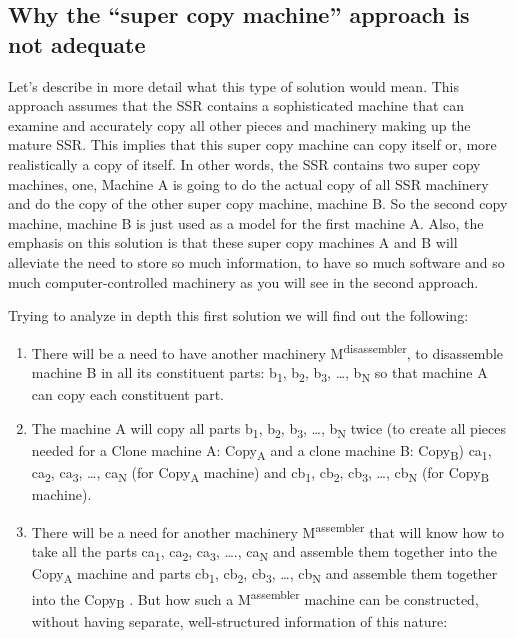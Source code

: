 \subsection[Why the “super copy machine” approach is not adequate]{Why
the “super copy machine” approach is not adequate}

\hypertarget{RefHeading3120306210128}{}Let’s describe in more detail
what this type of solution would mean. This approach assumes that the
SSR contains a sophisticated machine that can examine and accurately
copy all other pieces and machinery making up the mature SSR. This
implies that this super copy machine can copy itself or, more
realistically a copy of itself. In other words, the SSR contains two
super copy machines, one, Machine A is going to do the actual copy of
all SSR machinery and do the copy of the other super copy machine,
machine B. So the second copy machine, machine B is just used as a
model for the first machine A. Also, the emphasis on this solution is
that these super copy machines A and B will alleviate the need to store
so much information, to have so much software and so much
computer-controlled machinery as you will see in the second approach.

Trying to analyze in depth this first solution we will find out the
following:

\begin{enumerate}
\item There will be a need to have another machinery
M\textsuperscript{disassembler}, to disassemble machine B in all its
constituent parts: b\textsubscript{1}, b\textsubscript{2},
b\textsubscript{3}, …, b\textsubscript{N }so that machine A can copy
each constituent part.
\item The machine A will copy all parts b\textsubscript{1},
b\textsubscript{2}, b\textsubscript{3}, …, b\textsubscript{N} twice (to
create all pieces needed for a Clone machine A: Copy\textsubscript{A}
and a clone machine B: Copy\textsubscript{B}) ca\textsubscript{1},
ca\textsubscript{2}, ca\textsubscript{3}, …, ca\textsubscript{N }(for
Copy\textsubscript{A }machine) and cb\textsubscript{1},
cb\textsubscript{2}, cb\textsubscript{3}, …, cb\textsubscript{N} (for
Copy\textsubscript{B} machine).
\item There will be a need for another machinery
M\textsuperscript{assembler }that will know how to take all the parts
ca\textsubscript{1}, ca\textsubscript{2}, ca\textsubscript{3}, ….,
ca\textsubscript{N} and assemble them together into the
Copy\textsubscript{A} machine and parts cb\textsubscript{1},
cb\textsubscript{2}, cb\textsubscript{3}, …, cb\textsubscript{N }and
assemble them together into the Copy\textsubscript{B }. But how such a
M\textsuperscript{assembler} machine can be constructed, without having
separate, well-structured information of this nature:
\end{enumerate}

